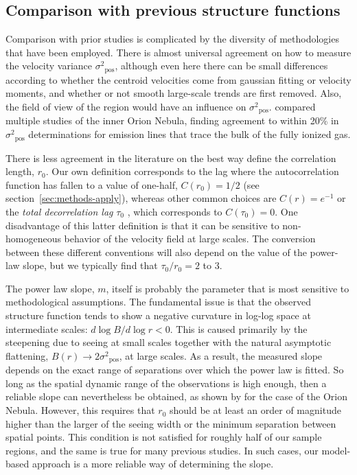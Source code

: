\documentclass[fleqn,usenatbib, useAMS, a4paper]{mnras}
\newcommand\pos{\ensuremath{_{\mathrm{pos}}}}
\begin{document}
\subsection{Comparison with previous structure functions}
\label{sec:comp-with-prev}
Comparison with prior studies is complicated by the
diversity of methodologies that  have been employed.
There is almost universal agreement on how to measure
the velocity variance \(\sigma^2\pos\),
although even here there can be small differences according
to whether the centroid velocities come from gaussian fitting
or velocity moments,
and whether or not smooth large-scale trends are first removed.
Also, the field of view of the region would have an influence on \(\sigma^2\pos\).
\citet{arthur2016turbulence} compared multiple studies of the
inner Orion Nebula, finding agreement to within 20\%
in \(\sigma^2\pos\) determinations
for emission lines that trace the bulk of the fully ionized gas.

There is less agreement in the literature on the best way
define the correlation length, \(r_0\).
Our own definition corresponds to the lag where the autocorrelation function
has fallen to a value of one-half,
\(C(r_0) = 1/2\) (see section~\ref{sec:methods-apply}),
whereas other common choices are \(C(r) = e^{-1}\)
\citep{Mivi1995}
or the \textit{total decorrelation lag} \(\tau_0\) \citep{lagrois2011},
which corresponds to \(C(\tau_0) = 0\).
One disadvantage of this latter definition is that it
can be sensitive to non-homogeneous behavior of the
velocity field at large scales. 
The conversion between these different conventions will also depend
on the value of the power-law slope,
but we typically find that \(\tau_0 / r_0 = \num{2}\) to \num{3}.

The power law slope, \(m\), itself is probably the parameter that
is most sensitive to methodological assumptions.
The fundamental issue is that the observed structure function tends to
show a negative curvature in log-log space at intermediate scales:
\(d\log B/ d\log r < 0\).
This is caused primarily by the steepening due to seeing at small scales
together with the natural asymptotic flattening, 
\(B(r) \to 2 \sigma^2\pos\), at large scales.
As a result, the measured slope depends on the exact range of
separations over which the power law is fitted.
So long as the spatial dynamic range of the observations is high enough,
then a reliable slope can nevertheless be obtained,
as shown by \citet{arthur2016turbulence} for the case of the Orion Nebula.
However, this requires that \(r_0\) should be at least an order of
magnitude higher than the larger of the seeing width
or the minimum separation between spatial points.
This condition is not satisfied for roughly half of our sample regions,
and the same is true for many previous studies.
In such cases, our model-based approach is a more reliable way of
determining the slope. 
\end{document}
